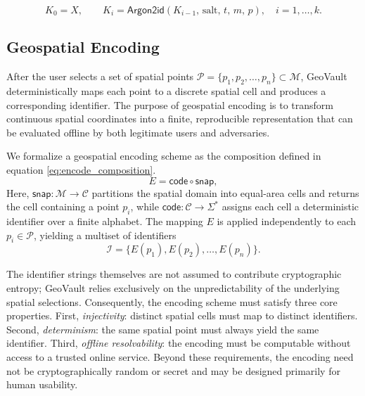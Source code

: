 \documentclass[journal,article,submit,pdftex,moreauthors]{Definitions/mdpi}
\begin{document}
\begin{equation}
K_0 = X, \qquad K_i = \mathsf{Argon2id}(K_{i-1},\,\text{salt},\,t,\,m,\,p), \quad i = 1, \dots, k.
\label{eq:kdf_chaining}
\end{equation}


\subsection{Geospatial Encoding}
\label{sec:spatial_models}

After the user selects a set of spatial points $\mathcal{P} = \{p_1, p_2, \dots, p_n\} \subset \mathcal{M}$, GeoVault deterministically maps each point to a discrete spatial cell and produces a corresponding identifier. The purpose of geospatial encoding is to transform continuous spatial coordinates into a finite, reproducible representation that can be evaluated offline by both legitimate users and adversaries.

We formalize a geospatial encoding scheme as the composition defined in equation \ref{eq:encode_composition}.
\begin{equation}
    E = \mathsf{code} \circ \mathsf{snap},
    \label{eq:encode_composition}
\end{equation}
Here, $\mathsf{snap}: \mathcal{M} \rightarrow \mathcal{C}$ partitions the spatial domain into equal-area cells and returns the cell containing a point $p_i$, while $\mathsf{code}: \mathcal{C} \rightarrow \Sigma^{*}$ assigns each cell a deterministic identifier over a finite alphabet. The mapping $E$ is applied independently to each $p_i \in \mathcal{P}$, yielding a multiset of identifiers
\begin{equation}
    \mathcal{I} = \{E(p_1), E(p_2), \dots, E(p_n)\}.
    \label{eq:identifier_multiset}
\end{equation}

The identifier strings themselves are not assumed to contribute cryptographic entropy; GeoVault relies exclusively on the unpredictability of the underlying spatial selections. Consequently, the encoding scheme must satisfy three core properties. First, \emph{injectivity}: distinct spatial cells must map to distinct identifiers. Second, \emph{determinism}: the same spatial point must always yield the same identifier. Third, \emph{offline resolvability}: the encoding must be computable without access to a trusted online service. Beyond these requirements, the encoding need not be cryptographically random or secret and may be designed primarily for human usability.
\end{document}
